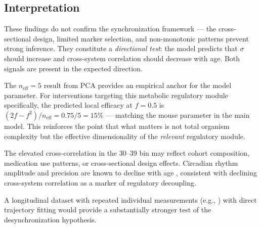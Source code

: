 \documentclass[12pt]{article}
\begin{document}
\subsection{Interpretation}

These findings do not confirm the synchronization framework — the cross-sectional
design, limited marker selection, and non-monotonic patterns prevent strong
inference. They constitute a \emph{directional test}: the model predicts that
$\sigma$ should increase and cross-system correlation should decrease with age.
Both signals are present in the expected direction.

The $n_\text{eff} = 5$ result from PCA provides an empirical anchor for the
model parameter. For interventions targeting this metabolic regulatory module
specifically, the predicted local efficacy at $f = 0.5$ is $(2f-f^2)/n_\text{eff}
= 0.75/5 = 15\%$ — matching the mouse parameter in the main model. This
reinforces the point that what matters is not total organism complexity but the
effective dimensionality of the \emph{relevant} regulatory module.

The elevated cross-correlation in the 30--39 bin may reflect cohort composition,
medication use patterns, or cross-sectional design effects. Circadian rhythm
amplitude and precision are known to decline with age \citep{monk2005},
consistent with declining cross-system correlation as a marker of regulatory
decoupling.

A longitudinal dataset with repeated individual measurements (e.g.,
\citealt{pyrkov2021}) with direct trajectory fitting would provide a
substantially stronger test of the desynchronization hypothesis.

\newpage

\end{document}
